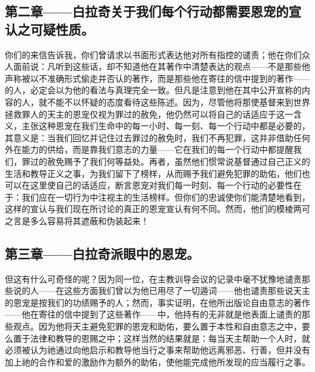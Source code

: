 
\subsection{第二章——白拉奇关于我们每个行动都需要恩宠的宣认之可疑性质。}

你们的来信告诉我，你们曾请求以书面形式表达他对所有指控的谴责；他在你们众人面前说：凡听到这些话，却不知道他在其著作中清楚表达的观点——不是那些他声称被以不准确形式偷走并否认的著作，而是那些他在寄往的信中提到的著作——的人，必定会以为他的看法与真理完全一致。但凡是注意到他在其中公开宣称的内容的人，就不能不以怀疑的态度看待这些陈述。因为，尽管他将那使基督来到世界拯救罪人的天主的恩宠仅视为罪过的赦免，他仍然可以将自己的话适应于这一含义，主张这种恩宠在我们生命中的每一小时、每一刻、每一个行动中都是必要的，其意义是：当我们回忆并记住过去罪过的赦免时，我们不再犯罪，这并非借助任何外在能力的供给，而是靠我们意志的力量——它在我们的每一个行动中都提醒我们，罪过的赦免赐予了我们何等益处。再者，虽然他们惯常说基督通过自己正义的生活和教导正义之事，为我们留下了榜样，从而赐予我们避免犯罪的助佑，他们也可以在这里使自己的话适应，断言恩宠对我们每一时刻、每一个行动的必要性在于：我们应在一切行为中注视主的生活榜样。但你们的忠诚使你们能清楚地看到，这样的宣认与我们现在所讨论的真正的恩宠宣认有何不同。然而，他们的模棱两可之言是多么容易将其遮蔽和伪装起来！\par


\subsection{第三章——白拉奇派眼中的恩宠。}

但这有什么可奇怪的呢？因为同一位，在主教训导会议的记录中毫不犹豫地谴责那些说的人——在这些方面我们曾以为他已用尽了一切遁词——他也谴责那些说天主的恩宠是按我们的功绩赐予的人；然而，事实证明，在他所出版论自由意志的著作——他在寄往的信中提到了这些著作——中，他持有的无非就是他表面上谴责的那些观点。因为他将天主避免犯罪的恩宠和助佑，要么置于本性和自由意志之中，要么置于法律和教导的恩赐之中；这样当然的结果就是：每当天主帮助一个人时，就必须被认为祂通过向他启示和教导他当行之事来帮助他远离邪恶、行善，但并没有加上祂的合作和爱的激励作为额外的助佑，使他能完成他所发现的应当履行之事。\par

